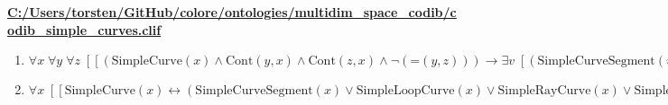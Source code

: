 \documentclass{article}
\begin{document}
\textbf{\url{C:/Users/torsten/GitHub/colore/ontologies/multidim\_space\_codib/codib\_simple\_curves.clif}}

\begin{enumerate}
\item $\forall x\; \forall y\; \forall z\;  \left[ \left[ \left(\textrm{SimpleCurve}(x) \land \textrm{Cont}(y,x) \land \textrm{Cont}(z,x) \land \neg \left(\textrm{=}(y,z)\right)\right) \rightarrow \exists v\;  \left[ \left(\textrm{SimpleCurveSegment}(v) \land \textrm{P}(v,x) \land \textrm{BCont}(y,v) \land \textrm{BCont}(z,v)\right) \right] \right] \right]$
\item $\forall x\;  \left[ \left[ \textrm{SimpleCurve}(x) \leftrightarrow \left(\textrm{SimpleCurveSegment}(x) \lor \textrm{SimpleLoopCurve}(x) \lor \textrm{SimpleRayCurve}(x) \lor \textrm{SimpleInfiniteCurve}(x)\right) \right] \right]$
\end{enumerate}
\end{document}
